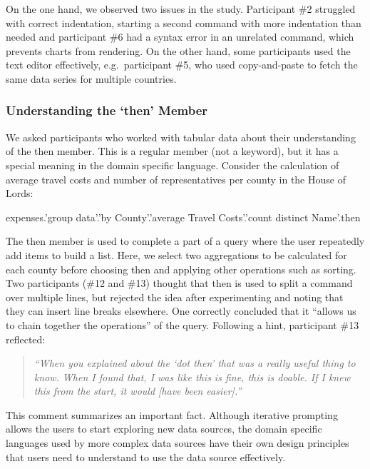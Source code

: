 \documentclass[manuscript,review,anonymous]{acmart}
\newcommand{\ikvd}[1]{{\fontfamily{zi4}\selectfont\small #1}}
\begin{document}
On the one hand, we observed two issues in the study. Participant \#2 struggled with correct indentation, starting
a second command with more indentation than needed and participant \#6 had a syntax error in an unrelated command,
which prevents charts from rendering. On the other hand, some participants used the text editor effectively,
e.g.~participant \#5, who used copy-and-paste to fetch the same data series for multiple countries.


\subsubsection*{Understanding the `then' Member}
We asked participants who worked with tabular data about their understanding of the \ikvd{then} member.
This is a regular member (not a keyword), but it has a special meaning in the domain specific language.
Consider the calculation of average travel costs and number of representatives per county in the House of Lords:

\begin{thegamma}
expenses.'group data'.'by County'.'average Travel Costs'.'count distinct Name'.then
\end{thegamma}

\noindent
The \ikvd{then} member is used to complete a part of a query where the user repeatedly
add items to build a list. Here, we select two aggregations to be calculated for each
county before choosing \ikvd{then} and applying other operations such as sorting.
Two participants (\#12 and \#13) thought that \ikvd{then} is used to split a command
over multiple lines, but rejected the idea after experimenting and noting that they can insert
line breaks elsewhere. One correctly concluded that it ``allows us to chain together the
operations'' of the query. Following a hint, participant \#13 reflected:

\begin{quote}
  \emph{``When you explained about the `dot then' that was a really useful thing to know.
  When I found that, I was like this is fine, this is doable. If I knew this from the start,
  it would [have been easier].''}
\end{quote}

\noindent
This comment summarizes an important fact. Although iterative prompting allows the users to start
exploring new data sources, the domain specific languages used by more complex data sources have
their own design principles that users need to understand to use the data source effectively.
\end{document}
